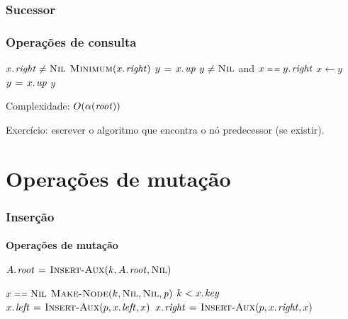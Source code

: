 \documentclass{beamer}
\begin{document}
\begin{frame}

\frametitle{Sucessor}
\frametitle{Operações de consulta}

\begin{codebox}
  \zi {}
  \li \If $\attrib{x}{right} \neq \const{Nil}$
  \li \Then \Return $\proc{Minimum}(\attrib{x}{right})$
      \End
  \li $y \gets \attrib{x}{up}$
  \li \While $y \neq \textnormal{\scshape Nil}$ and $x \isequal \attrib{y}{right}$
  \li \Do $x \gets y$
  \li   $y \gets \attrib{x}{up}$
      \End
  \li \Return $y$
\end{codebox}

Complexidade: $O(\alpha(\id{root}))$
\pause

Exercício: escrever o algoritmo que encontra o nó predecessor (se existir).

\end{frame}


\section{Operações de mutação}

\begin{frame}

\frametitle{Inserção}
\framesubtitle{Operações de mutação}

\begin{codebox}
  \zi {}
  \li $\attrib{A}{root} \gets \proc{Insert-Aux}(k, \attrib{A}{root}, \const{Nil})$
  \zi {}
\end{codebox}

\begin{codebox}
  \zi {}
  \zi {}
  \zi {}
  \li \If $x \isequal \const{Nil}$
  \li \Then \Return $\proc{Make-Node}(k, \const{Nil}, \const{Nil}, \id{p})$
  \li \Else
  \li    \If $k < \attrib{x}{key}$
  \li    \Then $\attrib{x}{left} \gets \proc{Insert-Aux}(p, \attrib{x}{left}, x)$
  \li    \Else $\attrib{x}{right} \gets \proc{Insert-Aux}(p, \attrib{x}{right}, x)$
         \End
       \End
\end{codebox}

\end{frame}
\end{document}

